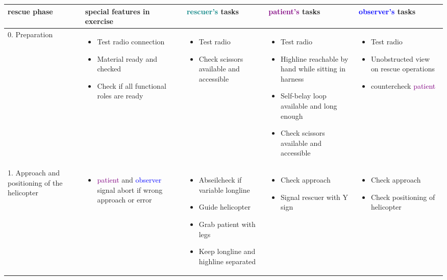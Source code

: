 \documentclass[a4paper,10pt]{scrartcl}
\begin{document}
\begin{landscape}

\begin{longtable}{|p{4cm}|p{4cm}|p{4cm}|p{4cm}|p{4cm}|}
 \hline
 rescue phase & special features in exercise & \textcolor{teal}{rescuer's} tasks & \textcolor{purple}{patient's} tasks & \textcolor{blue}{observer's} tasks \\ 
 \hline
 \hline 
 0. Preparation & 
 \begin{itemize}
    \item Test radio connection
    \item Material ready and checked
    \item Check if all functional roles are ready
  \end{itemize} & 
   \begin{itemize}
    \item Test radio
    \item Check scissors available and accessible
  \end{itemize} & 
   \begin{itemize}
    \item Test radio
    \item Highline reachable by hand while sitting in harness
    \item Self-belay loop available and long enough
    \item Check scissors available and accessible
  \end{itemize} & 
   \begin{itemize}
    \item Test radio
    \item Unobstructed view on rescue operations
    \item countercheck \textcolor{purple}{patient}
  \end{itemize} \\
  \hline
  
 1. Approach and positioning of the helicopter &
 \begin{itemize}
    \item \textcolor{purple}{patient} and \textcolor{blue}{observer} signal abort if wrong approach or error
  \end{itemize} & 
   \begin{itemize}
    \item Abseilcheck if variable longline
    \item Guide helicopter
    \item Grab patient with legs
    \item Keep longline and highline separated
  \end{itemize} & 
   \begin{itemize}
    \item Check approach
    \item Signal rescuer with Y sign
  \end{itemize} & 
   \begin{itemize}
    \item Check approach
    \item Check positioning of helicopter
  \end{itemize} \\
  \hline
  

\end{longtable}
\end{landscape}
\end{document}
